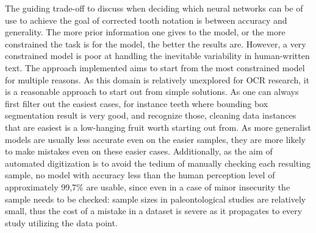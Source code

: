 \documentclass{article}
\begin{document}
The guiding trade-off to discuss when deciding which neural networks can be of use to achieve the goal
of corrected tooth notation is between accuracy and generality. The more prior information one gives to 
the model, or the more constrained the task is for the model, the better the results are. However, a very 
constrained model is poor at handling the inevitable variability in human-written text.
The approach implemented aims to start from the most constrained model for multiple reasons. 
As this domain is relatively unexplored for OCR research, it is a reasonable approach to start out from simple solutions. As one can always first filter out the easiest 
cases, for instance teeth where bounding box segmentation result is very good, and recognize those,
cleaning data instances that are easiest is a low-hanging fruit worth starting out from. As more generalist 
models are usually less accurate even on the easier samples, they are more likely to make mistakes even on these 
easier cases. Additionally, as the aim of automated digitization is to avoid the tedium of manually checking
each resulting sample, no model with accuracy less than the human perception level of approximately 99,7\%
are usable, since even in a case of minor insecurity the sample needs to be checked: sample sizes 
in paleontological studies are relatively small, thus the cost of a mistake in a dataset is severe as it propagates 
to every study utilizing the data point.
\end{document}
